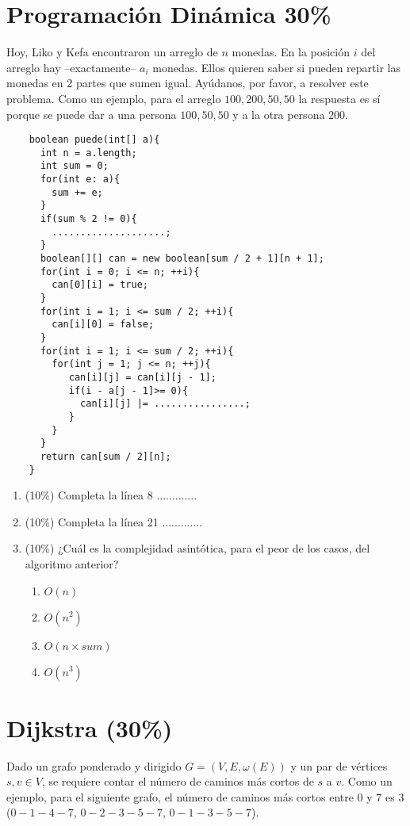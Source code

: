 \documentclass[10 pt]{article}
\begin{document}
\begin{multicols}{2}
	\section{Programación Dinámica 30\%}
	Hoy, Liko y Kefa encontraron un arreglo de $n$ monedas. En la posición $i$ del arreglo hay --exactamente-- $a_i$ monedas. Ellos quieren saber si pueden repartir las monedas en 2 partes que sumen igual. Ayúdanos, por favor, a resolver este problema. Como un ejemplo, para el arreglo
	$100, 200, 50, 50$ la respuesta es sí porque se puede dar a una persona $100, 50, 50$ y a la otra persona $200$.
	\begin{lstlisting}
	boolean puede(int[] a){
	  int n = a.length;
	  int sum = 0;
	  for(int e: a){
	    sum += e;
	  }
	  if(sum % 2 != 0){
	    ....................;
	  }
	  boolean[][] can = new boolean[sum / 2 + 1][n + 1];
	  for(int i = 0; i <= n; ++i){
	    can[0][i] = true;
	  }
	  for(int i = 1; i <= sum / 2; ++i){
	    can[i][0] = false;
	  }
	  for(int i = 1; i <= sum / 2; ++i){
	    for(int j = 1; j <= n; ++j){
	       can[i][j] = can[i][j - 1];
	       if(i - a[j - 1]>= 0){
		     can[i][j] |= ................;
	       }
	    }
	  }
	  return can[sum / 2][n];
	}
	\end{lstlisting}
	\begin{enumerate}[label=\alph*)]
		\item (10\%) Completa la línea 8  .............
		\item (10\%) Completa la línea 21 .............
		\item (10\%) ¿Cuál es la complejidad asintótica, para el peor de los casos, del algoritmo anterior?
		\begin{enumerate}[label=\roman*)]
			\item $O(n)$
			\item $O(n^2)$
			\item $O(n \times sum)$
			\item $O(n^3)$
		\end{enumerate}
	\end{enumerate}

\section{Dijkstra (30\%)}
	Dado un grafo ponderado y dirigido $G = (V, E, \omega(E))$ y un par de vértices $s, v \in V$, se requiere contar el número de caminos más cortos de $s$ a $v$. Como un ejemplo, para el siguiente grafo, el número de caminos más cortos entre $0$ y $7$ es $3$ ($0-1-4-7$, $0-2-3-5-7$, $0-1-3-5-7$).
		\begin{itemize}[noitemsep]
		

\end{itemize}
\end{multicols}
\end{document}

